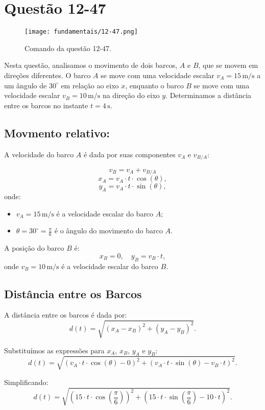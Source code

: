 \newpage
\section{Questão 12-47}

\begin{figure}[H]
	\centering
	\texttt{[image: fundamentais/12-47.png]}
	\caption{Comando da questão 12-47.}\label{fig:12-47}
\end{figure}

Nesta questão, analisamos o movimento de dois barcos, \(A\) e \(B\), que se movem em direções diferentes. O barco \(A\) se move com uma velocidade escalar \(v_A = 15 \, \text{m/s}\) a um ângulo de \(30^\circ\) em relação ao eixo \(x\), enquanto o barco \(B\) se move com uma velocidade escalar \(v_B = 10 \, \text{m/s}\) na direção do eixo \(y\). Determinamos a distância entre os barcos no instante \(t = 4 \, \text{s}\).

\subsection*{Movmento relativo:}
A velocidade do barco \(A\) é dada por suas componentes \(v_A\) e \(v_{B/A}\):

\[
v_B = v_A + v_{B/A}
\]
\[
x_A = v_A \cdot t \cdot \cos(\theta),
\]
\[
y_A = v_A \cdot t \cdot \sin(\theta),
\]
onde:
\begin{itemize}
    \item \(v_A = 15 \, \text{m/s}\) é a velocidade escalar do barco \(A\);
    \item \(\theta = 30^\circ = \frac{\pi}{6}\) é o ângulo do movimento do barco \(A\).
\end{itemize}

A posição do barco \(B\) é:
\[
x_B = 0, \quad y_B = v_B \cdot t,
\]
onde \(v_B = 10 \, \text{m/s}\) é a velocidade escalar do barco \(B\).

\subsection*{Distância entre os Barcos}
A distância entre os barcos é dada por:
\[
d(t) = \sqrt{(x_A - x_B)^2 + (y_A - y_B)^2}.
\]

Substituímos as expressões para \(x_A\), \(x_B\), \(y_A\) e \(y_B\):
\[
d(t) = \sqrt{\left(v_A \cdot t \cdot \cos(\theta) - 0\right)^2 + \left(v_A \cdot t \cdot \sin(\theta) - v_B \cdot t\right)^2}.
\]

Simplificando:
\[
d(t) = \sqrt{\left(15 \cdot t \cdot \cos\left(\frac{\pi}{6}\right)\right)^2 + \left(15 \cdot t \cdot \sin\left(\frac{\pi}{6}\right) - 10 \cdot t\right)^2}.
\]

